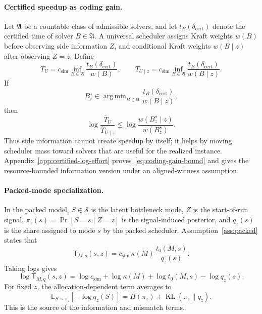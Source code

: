 \documentclass{article}
\DeclareMathOperator*{\argmin}{arg\,min}
\DeclareMathOperator{\KL}{KL}
\newcommand{\cS}{\mathcal{S}}
\newcommand{\E}{\mathbb{E}}
\begin{document}
\paragraph{Certified speedup as coding gain.}
Let \(\mathfrak A\) be a countable class of admissible solvers, and let
\(t_B(\delta_{\mathrm{cert}})\) denote the certified time of solver \(B\in\mathfrak A\).
A universal scheduler assigns Kraft weights \(w(B)\) before observing side information
\(Z\), and conditional Kraft weights \(w(B\mid z)\) after observing \(Z=z\).  Define
\[
    \overline T_U
    =
    c_{\mathrm{sim}}
    \inf_{B\in\mathfrak A}
    \frac{t_B(\delta_{\mathrm{cert}})}{w(B)},
    \qquad
    \overline T_{U\mid z}
    =
    c_{\mathrm{sim}}
    \inf_{B\in\mathfrak A}
    \frac{t_B(\delta_{\mathrm{cert}})}{w(B\mid z)} .
\]
If
\[
    B_z^\star
    \in
    \argmin_{B\in\mathfrak A}
    \frac{t_B(\delta_{\mathrm{cert}})}{w(B\mid z)},
\]
then
\begin{equation}
\label{eq:coding-gain-bound}
    \log\frac{\overline T_U}{\overline T_{U\mid z}}
    \le
    \log\frac{w(B_z^\star\mid z)}{w(B_z^\star)} .
\end{equation}
Thus side information cannot create speedup by itself; it helps by moving scheduler mass
toward solvers that are useful for the realized instance.  Appendix~\ref{app:certified-log-effort}
proves~\eqref{eq:coding-gain-bound} and gives the resource-bounded information version
under an aligned-witness assumption.

\paragraph{Packed-mode specialization.}
In the packed model, \(S\in\cS\) is the latent bottleneck mode, \(Z\) is the start-of-run
signal, \(\pi_z(s)=\Pr[S=s\mid Z=z]\) is the signal-induced posterior, and \(q_z(s)\)
is the share assigned to mode \(s\) by the packed scheduler.  Assumption~\ref{ass:packed}
states that
\[
    \mathsf T_{M,q}(s,z)
    =
    c_{\mathrm{sim}}\,
    \kappa(M)\,
    \frac{t_0(M,s)}{q_z(s)} .
\]
Taking logs gives
\[
    \log \mathsf T_{M,q}(s,z)
    =
    \log c_{\mathrm{sim}}
    +
    \log\kappa(M)
    +
    \log t_0(M,s)
    -
    \log q_z(s).
\]
For fixed \(z\), the allocation-dependent term averages to
\[
    \E_{S\sim\pi_z}[-\log q_z(S)]
    =
    H(\pi_z)+\KL(\pi_z\|q_z).
\]
This is the source of the information and mismatch terms.
\end{document}
